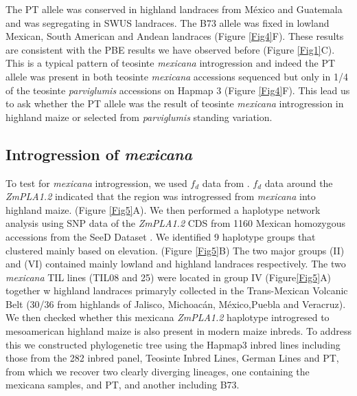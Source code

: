 \documentclass[9pt,twocolumn,twoside]{BioRxiv}
\begin{document}
The PT allele was conserved in highland landraces from México and Guatemala and was segregating in SWUS landraces. The B73 allele was fixed in lowland Mexican, South American and Andean landraces (Figure \ref{Fig4}F). 
These results are consistent with the PBE results we have observed before (Figure \ref{Fig1}C).
This is a typical pattern of teosinte \textit{mexicana} introgression \cite{Wang2020-mp} and indeed the PT allele was present in both teosinte \textit{mexicana} accessions sequenced but only in 1/4 of the teosinte \textit{parviglumis} accessions on Hapmap 3 \cite{Bukowski2017-ng} (Figure \ref{Fig4}F). 
This lead us to ask whether the PT allele was the result of teosinte \textit{mexicana} introgression in highland maize or selected from \textit{parviglumis} standing variation. 
\subsection{Introgression of \textit{mexicana}} 
To test for \textit{mexicana} introgression, we used \(f_d\) data from \cite{Gonzalez-Segovia2019-jy}.
\(f_d\) data around the \textit{ZmPLA1.2} indicated that the region was introgressed from \textit{mexicana} into highland maize. (Figure \ref{Fig5}A).
We then performed a haplotype network analysis using SNP data of the \textit{ZmPLA1.2} CDS from 1160 Mexican homozygous accessions from the SeeD Dataset \cite{Romero_Navarro2017-cn}. 
We identified 9 haplotype groups that clustered mainly based on elevation. (Figure \ref{Fig5}B) 
The two major groups (II) and (VI) contained mainly lowland and highland landraces respectively. 
The two \textit{mexicana} TIL lines (TIL08 and 25) were located in group IV  (Figure\ref{Fig5}A) together w highland landraces primaryly collected in the Trans-Mexican Volcanic Belt (30/36 from highlands of Jalisco, Michoacán, México,Puebla and Veracruz).
We then checked whether this mexicana \textit{ZmPLA1.2}  haplotype  introgresed to mesoamerican highland maize is also present in modern maize inbreds. 
To address this we constructed phylogenetic tree using the Hapmap3 inbred lines including those from the 282 inbred panel, Teosinte Inbred Lines, German Lines and PT, from which we recover two clearly diverging lineages, one containing the mexicana samples, and PT,  and another including B73.
\end{document}

